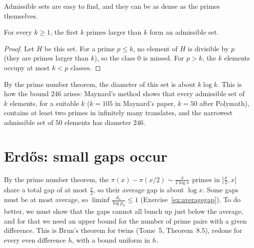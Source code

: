 Admissible sets are easy to find, and they can be as dense as the primes themselves.

\begin{proposition}\label{prop:firstprimes}
For every $k\ge1$, the first $k$ primes larger than $k$ form an admissible set.
\end{proposition}
\begin{proof}
Let $H$ be this set. For a prime $p\le k$, no element of $H$ is divisible by $p$ (they are primes larger than $k$), so the class $0$ is missed. For
$p>k$, the $k$ elements occupy at most $k<p$ classes.
\end{proof}

By the prime number theorem, the diameter of this set is about $k\log k$. This is how the bound $246$ arises: Maynard's method shows that every
admissible set of $k$ elements, for a suitable $k$ ($k=105$ in Maynard's paper, $k=50$ after Polymath), contains at least two primes in infinitely many
translates, and the narrowest admissible set of $50$ elements has diameter $246$.

\section{Erd\H{o}s: small gaps occur}

By the prime number theorem, the $\pi(x)-\pi(x/2)\sim\frac x{2\log x}$ primes in $]\frac x2,x]$ share a total gap of at most $\frac x2$, so their average
gap is about $\log x$. Some gaps must be at most average, so $\liminf\frac{d_n}{\log p_n}\le1$ (Exercise~\ref{ex:averagegap}). To do better, we must
show that the gaps cannot all bunch up just below the average, and for that we need an upper bound for the number of prime pairs with a given
difference. This is Brun's theorem for twins (Tome~5, Theorem~8.5), redone for every even difference $h$, with a bound uniform in $h$.

